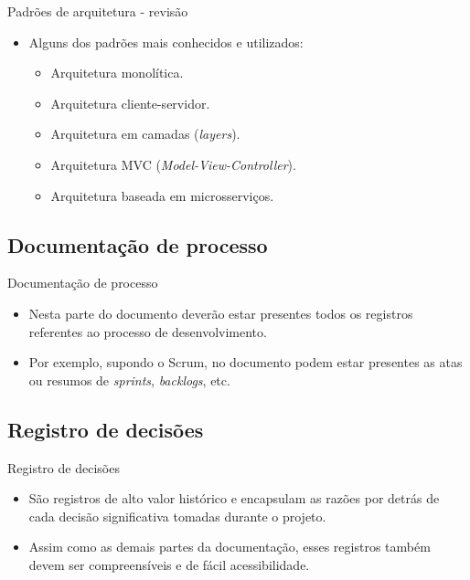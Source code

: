 \documentclass{beamer}
\begin{document}
\begin{frame}{Padrões de arquitetura - revisão}
	\begin{itemize}
		\justifying
		\item Alguns dos padrões mais conhecidos e utilizados:
			\begin{itemize}
				\item Arquitetura monolítica.
				\item Arquitetura cliente-servidor.
				\item Arquitetura em camadas (\textit{layers}).
				\item Arquitetura MVC (\textit{Model-View-Controller}).
				\item Arquitetura baseada em microsserviços.
			\end{itemize}
	\end{itemize}
\end{frame}

\subsection{Documentação de processo}

\begin{frame}{Documentação de processo}
	\begin{itemize}
		\justifying
		\item Nesta parte do documento deverão estar presentes todos os registros referentes ao processo de desenvolvimento.
		\item Por exemplo, supondo o Scrum, no documento podem estar presentes as atas ou resumos de \textit{sprints}, \textit{backlogs}, etc.
	\end{itemize}
\end{frame}

\subsection{Registro de decisões}

\begin{frame}{Registro de decisões}
	\begin{itemize}
		\justifying
		\item São registros de alto valor histórico e encapsulam as razões por detrás de cada decisão significativa tomadas durante o projeto.
		\item Assim como as demais partes da documentação, esses registros também devem ser compreensíveis e de fácil acessibilidade.
	\end{itemize}
\end{frame}
\end{document}

